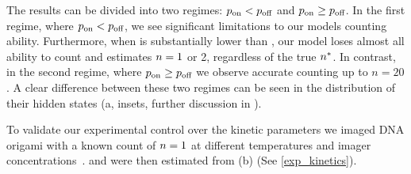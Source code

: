 The results can be divided into two regimes: $p_\text{on} < p_\text{off}$ and $p_\text{on} \geq p_\text{off}$.
	In the first regime, where $p_\text{on} < p_\text{off}$, we see significant limitations to our models counting ability.
	Furthermore, when \pon is substantially lower than \poff, our model loses almost 
	all ability to count and estimates $n=1$ or 2, regardless of the true $n^*$.
	In contrast, in the second regime, where $p_\text{on} \geq p_\text{off}$ we observe 
	accurate counting up to $n=20$.
	A clear difference between these two regimes can be seen in the distribution 
	of their hidden states \z{} (a, insets, 
	further discussion in ).
	
To validate our experimental control over the kinetic parameters we imaged DNA 
origami with a known count of $n=1$ at different temperatures and imager
concentrations~\citep{jungmann_single-molecule_2010}. 
	\pon and \poff were then estimated from \ours (b) 
	(See \ref{exp_kinetics}).


